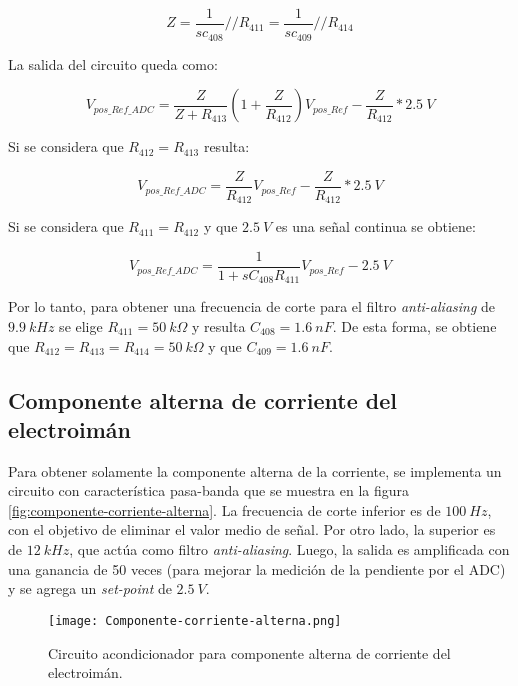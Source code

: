 \begin{equation*} 
	Z=\frac{1}{sc_{408}}//R_{411}=\frac{1}{sc_{409}}//R_{414}
\end{equation*}

La salida del circuito queda como:

\begin{equation*} 
	V_{pos\_Ref\_ADC}=\frac{Z}{Z+R_{413}}(1+\frac{Z}{R_{412}})V_{pos\_Ref}-\frac{Z}{R_{412}}*2.5\:V
\end{equation*}

Si se considera que $R_{412}=R_{413}$ resulta:

\begin{equation*} 
	V_{pos\_Ref\_ADC}=\frac{Z}{R_{412}}V_{pos\_Ref}-\frac{Z}{R_{412}}*2.5\:V
\end{equation*}


Si se considera que $R_{411}=R_{412}$ y que $2.5\:V$ es una señal continua se obtiene:

\begin{equation*} 
	V_{pos\_Ref\_ADC}=\frac{1}{1+sC_{408}R_{411}}V_{pos\_Ref}-2.5\:V
\end{equation*}

Por lo tanto, para obtener una frecuencia de corte para el filtro \textsl{anti-aliasing} de $9.9\:kHz$ se elige $R_{411}=50\:k\Omega$ y resulta $C_{408}=1.6\:nF$. De esta forma, se obtiene que $R_{412}=R_{413}=R_{414}=50\:k\Omega$ y que $C_{409}=1.6\:nF$.


\subsection{Componente  alterna de corriente del electroimán}

 Para obtener solamente la componente alterna de la corriente, se implementa un circuito con característica pasa-banda que se muestra en la figura \ref{fig:componente-corriente-alterna}. La frecuencia de corte inferior  es de $100\:Hz$, con el objetivo de eliminar el valor medio de señal. Por otro lado, la superior es de $12\:kHz$, que actúa como filtro \textsl{anti-aliasing}. Luego, la salida es amplificada con una ganancia de 50 veces (para mejorar la medición de la pendiente por el ADC) y se agrega un \textsl{set-point} de $2.5\:V$.

\begin{figure}[H]
	\centering
	\texttt{[image: Componente-corriente-alterna.png]}
	\caption{ Circuito acondicionador para componente alterna de corriente del electroimán.
	}

\end{figure}


